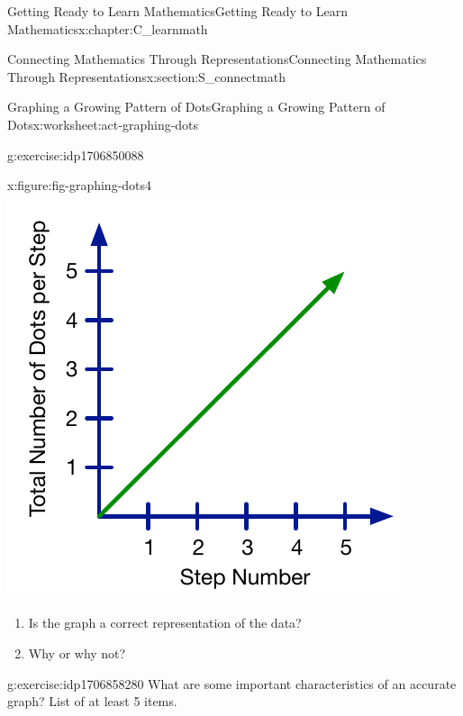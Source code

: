 \documentclass[oneside,10pt,]{book}
\numberwithin{equation}{chapter}
\begin{document}
\begin{chapterptx}{Getting Ready to Learn Mathematics}{}{Getting Ready to Learn Mathematics}{}{}{x:chapter:C_learnmath}
\begin{sectionptx}{Connecting Mathematics Through Representations}{}{Connecting Mathematics Through Representations}{}{}{x:section:S_connectmath}
\begin{worksheet-subsection}{Graphing a Growing Pattern of Dots}{}{Graphing a Growing Pattern of Dots}{}{}{x:worksheet:act-graphing-dots}
\begin{divisionexercise}{1}{}{}{g:exercise:idp1706850088}
\begin{sidebyside}{4}{0}{0}{0}
\begin{sbspanel}{0.25}
\begin{figureptx}{}{x:figure:fig-graphing-dots4}{}
\includegraphics[width=\linewidth]{external/graphing-dots4.pdf}
\tcblower
\end{figureptx}%
\end{sbspanel}%
\end{sidebyside}%
%
\begin{enumerate}[font=\bfseries,label=(\alph*),ref=\alph*]
\item{}Is the graph a correct representation of the data?%
\item{}Why or why not?%
\end{enumerate}
\end{divisionexercise}%
\begin{divisionexercise}{2}{}{}{g:exercise:idp1706858280}%
What are some important characteristics of an accurate graph? List of at least 5 items.%
\end{divisionexercise}%
\begin{conclusion}{}%

\end{conclusion}
\end{worksheet-subsection}
\end{sectionptx}
\end{chapterptx}
\end{document}
